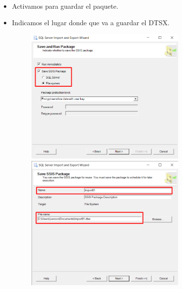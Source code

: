 \documentclass{article}
\begin{document}
\begin{itemize}
\item Activamos para guardar el paquete.
\item Indicamos el lugar donde que va a guardar el DTSX.
	\begin{figure}[htb]
		\begin{center}
			\includegraphics[width=8cm]{./images/Tarea1_7}
			\includegraphics[width=8cm]{./images/Tarea1_8}
		\end{center}
	\end{figure}




\end{itemize}
\end{document}
